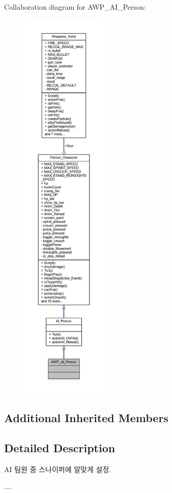 Collaboration diagram for A\+W\+P\+\_\+\+A\+I\+\_\+\+Person\+:
\nopagebreak
\begin{figure}[H]
\begin{center}
\leavevmode
\includegraphics[height=550pt]{class_a_w_p___a_i___person__coll__graph}
\end{center}
\end{figure}
\subsection*{Additional Inherited Members}


\subsection{Detailed Description}
AI 팀원 중 스나이퍼에 알맞게 설정. 

.... 